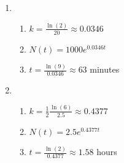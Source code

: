 \documentclass{ximera}
\begin{document}
\begin{multicols}{2}
\begin{enumerate}
\setcounter{enumi}{\value{HW}}

\item  \begin{enumerate} \item  $k = \frac{\ln(2)}{20} \approx 0.0346$

\item  $N(t) = 1000e^{0.0346 t}$

\item  $t = \frac{\ln(9)}{0.0346} \approx 63$ minutes

\end{enumerate}

\item  \begin{enumerate} \item  $k = \frac{1}{2}\frac{\ln(6)}{2.5} \approx 0.4377$

\item  $N(t) = 2.5e^{0.4377 t}$

\item  $t = \frac{\ln(2)}{0.4377} \approx 1.58$ hours

\end{enumerate}

\setcounter{HW}{\value{enumi}}
\end{enumerate}
\end{multicols}
\end{document}
